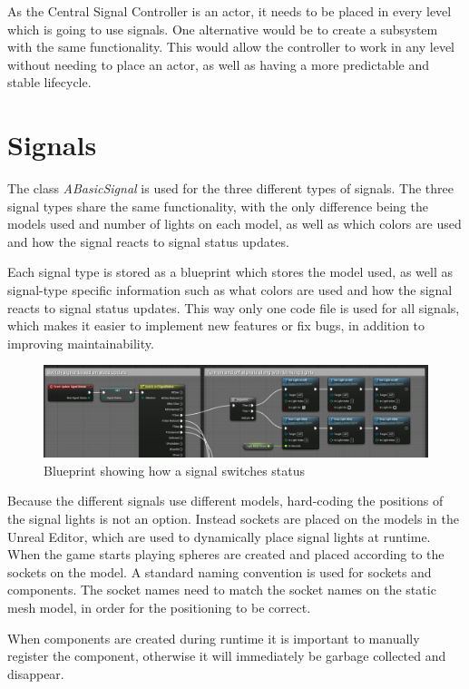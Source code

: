 As the Central Signal Controller is an actor, it needs to be placed in every level which is going to use signals. One alternative would be to create a subsystem with the same functionality. This would allow the controller to work in any level without needing to place an actor, as well as having a more predictable and stable lifecycle. 

\section{Signals}

The class \textit{ABasicSignal} is used for the three different types of signals. The three signal types share the same functionality, with the only difference being the models used and number of lights on each model, as well as which colors are used and how the signal reacts to signal status updates. 

Each signal type is stored as a blueprint which stores the model used, as well as signal-type specific information such as what colors are used and how the signal reacts to signal status updates. This way only one \cpp code file is used for all signals, which makes it easier to implement new features or fix bugs, in addition to improving maintainability. 

\begin{figure}[h]
    \centerline{\includegraphics[width=1\textwidth]{figures/Signal_switch.png}}
    \caption{Blueprint showing how a signal switches status}
\end{figure} 

Because the different signals use different models, hard-coding the positions of the signal lights is not an option. Instead sockets are placed on the models in the Unreal Editor, which are used to dynamically place signal lights at runtime. When the game starts playing spheres are created and placed according to the sockets on the model. A standard naming convention is used for sockets and components. The socket names need to match the socket names on the static mesh model, in order for the positioning to be correct. 

When components are created during runtime it is important to manually register the component, otherwise it will immediately be garbage collected and disappear. 

